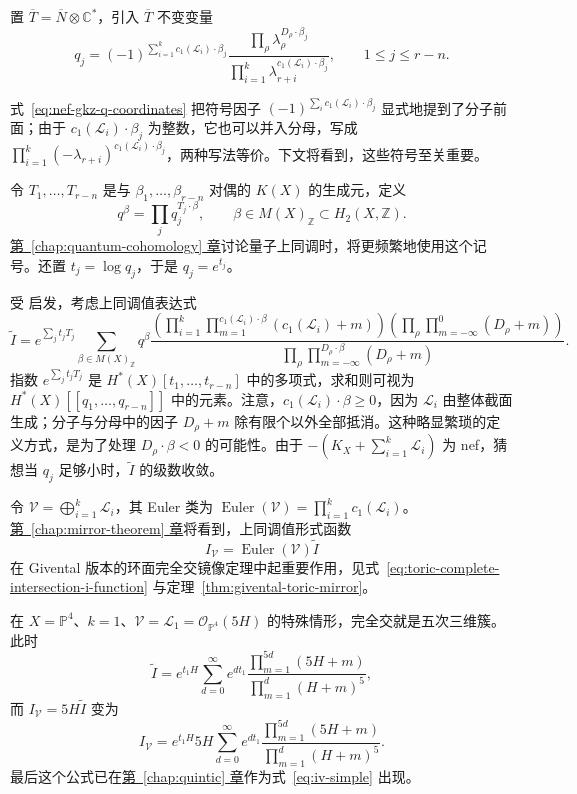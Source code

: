 置 $\overline T=\overline N\otimes\mathbb C^*$，引入 $\overline T$ 不变变量
\begin{equation}\label{eq:nef-gkz-q-coordinates}
q_j=(-1)^{\sum_{i=1}^k c_1(\mathcal L_i)\cdot\beta_j}
\frac{\prod_\rho\lambda_\rho^{D_\rho\cdot\beta_j}}
{\prod_{i=1}^k\lambda_{r+i}^{c_1(\mathcal L_i)\cdot\beta_j}},
\qquad 1\leq j\leq r-n.
\end{equation}

式~\eqref{eq:nef-gkz-q-coordinates} 把符号因子 $(-1)^{\sum_ic_1(\mathcal L_i)\cdot\beta_j}$ 显式地提到了分子前面；由于 $c_1(\mathcal L_i)\cdot\beta_j$ 为整数，它也可以并入分母，写成 $\prod_{i=1}^k(-\lambda_{r+i})^{c_1(\mathcal L_i)\cdot\beta_j}$，两种写法等价。下文将看到，这些符号至关重要。

令 $T_1,\ldots,T_{r-n}$ 是与 $\beta_1,\ldots,\beta_{r-n}$ 对偶的 $K(X)$ 的生成元，定义
\[
q^\beta=\prod_jq_j^{T_j\cdot\beta},
\qquad \beta\in M(X)_{\mathbb Z}\subset H_2(X,\mathbb Z).
\]
\hyperref[chap:quantum-cohomology]{第~\ref*{chap:quantum-cohomology} 章}讨论量子上同调时，将更频繁地使用这个记号。还置 $t_j=\log q_j$，于是 $q_j=e^{t_j}$。

受  启发，考虑上同调值表达式
\[
\widetilde I=e^{\sum_jt_jT_j}\sum_{\beta\in M(X)_{\mathbb Z}}q^\beta
\frac{\left(\prod_{i=1}^k\prod_{m=1}^{c_1(\mathcal L_i)\cdot\beta}
(c_1(\mathcal L_i)+m)\right)
\left(\prod_\rho\prod_{m=-\infty}^{0}(D_\rho+m)\right)}
{\prod_\rho\prod_{m=-\infty}^{D_\rho\cdot\beta}(D_\rho+m)}.
\]
指数 $e^{\sum_jt_jT_j}$ 是 $H^*(X)[t_1,\ldots,t_{r-n}]$ 中的多项式，求和则可视为
$H^*(X)[[q_1,\ldots,q_{r-n}]]$ 中的元素。注意，$c_1(\mathcal L_i)\cdot\beta\geq0$，因为 $\mathcal L_i$ 由整体截面生成；分子与分母中的因子 $D_\rho+m$ 除有限个以外全部抵消。这种略显繁琐的定义方式，是为了处理 $D_\rho\cdot\beta<0$ 的可能性。由于 $-(K_X+\sum_{i=1}^k\mathcal L_i)$ 为 nef，猜想当 $q_j$ 足够小时，$\widetilde I$ 的级数收敛。

令 $\mathcal V=\bigoplus_{i=1}^k\mathcal L_i$，其 Euler 类为
$\operatorname{Euler}(\mathcal V)=\prod_{i=1}^kc_1(\mathcal L_i)$。\hyperref[chap:mirror-theorem]{第~\ref*{chap:mirror-theorem} 章}将看到，上同调值形式函数
\begin{equation}\label{eq:nef-givental-iv}
I_{\mathcal V}=\operatorname{Euler}(\mathcal V)\widetilde I
\end{equation}
在 Givental 版本的环面完全交镜像定理中起重要作用，见式~\eqref{eq:toric-complete-intersection-i-function} 与定理~\ref{thm:givental-toric-mirror}。

在 $X=\mathbb P^4$、$k=1$、$\mathcal V=\mathcal L_1=\mathcal O_{\mathbb P^4}(5H)$ 的特殊情形，完全交就是五次三维簇。此时
\begin{equation}\label{eq:quintic-tilde-i}
\widetilde I=e^{t_1H}\sum_{d=0}^\infty e^{dt_1}
\frac{\prod_{m=1}^{5d}(5H+m)}{\prod_{m=1}^{d}(H+m)^5},
\end{equation}
而 $I_{\mathcal V}=5H\widetilde I$ 变为
\begin{equation}\label{eq:quintic-iv-hypergeometric}
I_{\mathcal V}=e^{t_1H}5H\sum_{d=0}^\infty e^{dt_1}
\frac{\prod_{m=1}^{5d}(5H+m)}{\prod_{m=1}^{d}(H+m)^5}.
\end{equation}
最后这个公式已在\hyperref[chap:quintic]{第~\ref*{chap:quintic} 章}作为式~\eqref{eq:iv-simple} 出现。


